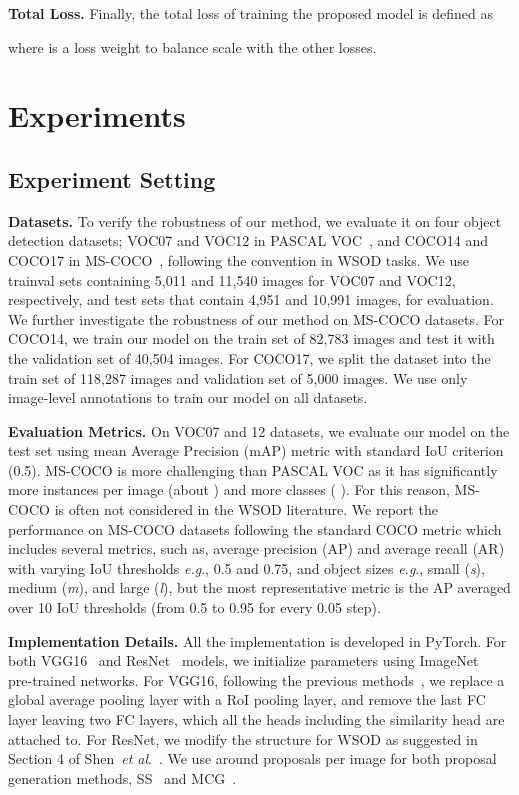 \documentclass[runningheads]{llncs}
\makeatletter
\DeclareRobustCommand\onedot{\futurelet\@let@token\@onedot}
\def\onedot{.} \def\eg{\emph{e.g}\onedot, } \def\Eg{\emph{E.g}\onedot}
\def\etal{\emph{et al}\onedot}
\makeatother
\begin{document}
\noindent\textbf{Total Loss.}
Finally, the total loss of training the proposed model is defined as

where  is a loss weight to balance scale with the other losses.



\section{Experiments}

\subsection{Experiment Setting}
\label{sec:experiments}
\noindent\textbf{Datasets.}
To verify the robustness of our method, we evaluate it on four object detection datasets; VOC07 and VOC12 in PASCAL VOC~\cite{Everingham15}, and COCO14 and COCO17 in MS-COCO~\cite{lin2014microsoft}, following the convention in WSOD tasks.
We use trainval sets containing 5,011 and 11,540 images for VOC07 and VOC12, respectively, and test sets that contain 4,951 and 10,991 images, for evaluation.
We further investigate the robustness of our method on MS-COCO datasets.
For COCO14, we train our model on the train set of 82,783 images and test it with the validation set of 40,504 images.
For COCO17, we split the dataset into the train set of 118,287 images and validation set of 5,000 images.
We use only image-level annotations to train our model on all datasets.



\noindent\textbf{Evaluation Metrics.}
On VOC07 and 12 datasets, we evaluate our model on the test set using mean Average Precision (mAP) metric with standard IoU criterion (0.5).
MS-COCO is more challenging than PASCAL VOC as it has significantly more instances per image (about  \vs{} ) and more classes ( \vs{} ). 
For this reason, MS-COCO is often not considered in the WSOD literature.
We report the performance on MS-COCO datasets following the standard COCO metric which includes several metrics, such as, average precision (AP) and average recall (AR) with varying IoU thresholds \eg 0.5 and 0.75, and object sizes \eg small (\textit{s}), medium (\textit{m}), and large (\textit{l}), but the most representative metric is the AP averaged over 10 IoU thresholds (from 0.5 to 0.95 for every 0.05 step). 

\noindent\textbf{Implementation Details.}
All the implementation is developed in PyTorch.
For both VGG16~\cite{VGG:Simonyan2014} and ResNet~\cite{he2016deep} models, we initialize parameters using ImageNet~\cite{deng2009imagenet} pre-trained networks.
For VGG16, following the previous methods~\cite{ren2020instance,huang2020comprehensive}, we replace a global average pooling layer with a RoI pooling layer, and remove the last FC layer leaving two FC layers, which all the heads including the similarity head are attached to.
For ResNet, we modify the structure for WSOD as suggested in Section 4 of Shen~\etal~\cite{shen2020enabling}.
We use around  proposals per image for both proposal generation methods, SS~\cite{uijlings2013selective} and MCG~\cite{arbelaez2014multiscale}.
\end{document}
